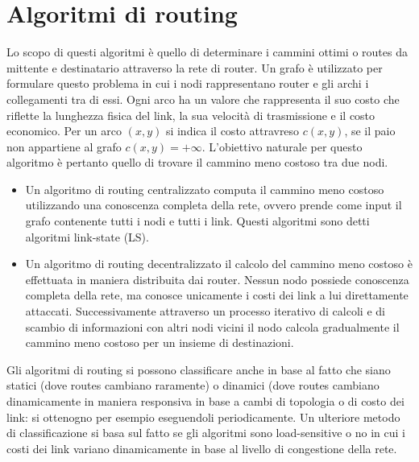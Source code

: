 \section{Algoritmi di routing}
Lo scopo di questi algoritmi \`e quello di determinare i cammini ottimi o routes da mittente e destinatario attraverso la rete di router. Un grafo \`e 
utilizzato per formulare questo problema in cui i nodi rappresentano router e gli archi i collegamenti tra di essi. Ogni arco ha un valore che rappresenta
il suo costo che riflette la lunghezza fisica del link, la sua velocit\`a di trasmissione e il costo economico. Per un arco $(x, y)$ si indica il costo 
attravreso $c(x, y)$, se il paio non appartiene al grafo $c(x, y)=+\infty$. L'obiettivo naturale per questo algoritmo \`e pertanto quello di trovare il 
cammino meno costoso tra due nodi. 
\begin{itemize}
\item Un algoritmo di routing centralizzato computa il cammino meno costoso utilizzando una conoscenza completa della rete, ovvero prende come input il 
grafo contenente tutti i nodi e tutti i link. Questi algoritmi sono detti algoritmi link-state (LS).
\item Un algoritmo di routing decentralizzato il calcolo del cammino meno costoso \`e effettuata in maniera distribuita dai router. Nessun nodo possiede 
conoscenza completa della rete, ma conosce unicamente i costi dei link a lui direttamente attaccati. Successivamente attraverso un processo iterativo di 
calcoli e di scambio di informazioni con altri nodi vicini il nodo calcola gradualmente il cammino meno costoso per un insieme di destinazioni. 
\end{itemize}
Gli algoritmi di routing si possono classificare anche in base al fatto che siano statici (dove routes cambiano raramente) o dinamici (dove routes cambiano
dinamicamente in maniera responsiva in base a cambi di topologia o di costo dei link: si ottenogno per esempio eseguendoli periodicamente. Un ulteriore 
metodo di classificazione si basa sul fatto se gli algoritmi sono load-sensitive o no in cui i costi dei link variano dinamicamente in base al livello di 
congestione della rete. 

